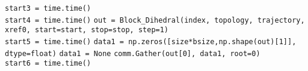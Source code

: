 \begin{algorithm}[t]
\begin{algorithmic}[1]
        \State \texttt{start3 = time.time()}
        \EndProcedure
        \\        
        \State \texttt{start4 = time.time()}
	\State \texttt{out = Block\_Dihedral(index, topology, trajectory, xref0, start=start, stop=stop, step=1)}
	\\
	\State \texttt{start5 = time.time()}
   	     \State \texttt{data1 = np.zeros([size*bsize,np.shape(out)[1]], dtype=float)}
	\Else
   	     \State \texttt{data1 = None}
             \State \texttt{comm.Gather(out[0], data1, root=0)}
        \EndIf
         \\
         \State \texttt{start6 = time.time()}
    \end{algorithmic}
\end{algorithm}